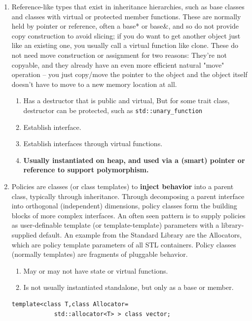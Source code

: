\documentclass[a4paper,11pt,twoside]{book}
\begin{document}
\begin{itemize}
\begin{enumerate}
		\item Reference-like types that exist in inheritance hierarchies, such as base classes and classes with virtual or protected member functions. These are normally held by pointer or reference, often a base* or base\&, and so do not provide copy construction to avoid slicing; if you do want to get another object just like an existing one, you usually call a virtual function like clone. These do not need move construction or assignment for two reasons: They're not copyable, and they already have an even more efficient natural "move" operation -- you just copy/move the pointer to the object and the object itself doesn't have to move to a new memory location at all.
		\begin{enumerate}
			\item Has a destructor that is public and virtual, But for some trait class, destructor can be protected, such as \texttt{std::unary\_function}
			\item Establish interface.
            \item Establish interfaces through virtual functions.
			\item \textbf{Usually instantiated on heap, and used via a (smart) pointer or reference to support polymorphism.} 
        \end{enumerate}
		

    \item Policies are classes (or class templates) to \textbf{inject behavior} into a parent class, typically through inheritance. Through decomposing a parent interface into orthogonal (independent) dimensions, policy classes form the building blocks of more complex interfaces. An often seen pattern is to supply policies as user-definable template (or template-template) parameters with a library-supplied default. An example from the Standard Library are the Allocators, which are policy template parameters of all STL containers. Policy classes (normally templates) are fragments of pluggable behavior.
        \begin{enumerate}
            \item May or may not have state or virtual functions.
            \item Is not usually instantiated standalone, but only as a base or member. 
        \end{enumerate}

\begin{lstlisting}[numbers=none]
template<class T,class Allocator=
			std::allocator<T> > class vector;
\end{lstlisting}
	

\end{enumerate}
\end{itemize}
\end{document}
